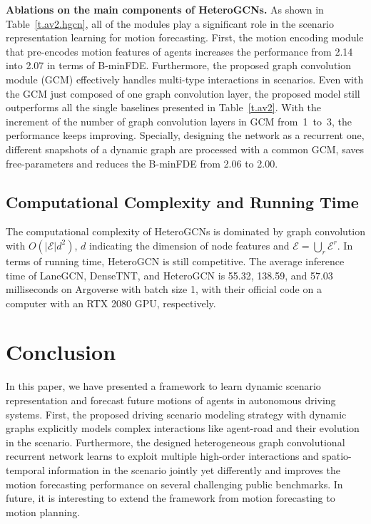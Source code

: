 \documentclass[letterpaper, 10 pt, conference]{ieeeconf}
\begin{document}
\textbf{Ablations on the main components of HeteroGCNs.} As shown in Table~\ref{t.av2.hgcn}, all of the modules play a significant role in the scenario representation learning for motion forecasting. First, the motion encoding module that pre-encodes motion features of agents
increases the performance from 2.14 into 2.07 in terms of B-minFDE. Furthermore, the proposed graph convolution module (GCM) effectively handles multi-type interactions in  scenarios. Even with the GCM just composed of one graph convolution layer, the proposed model still outperforms all the single baselines presented in Table~\ref{t.av2}. With the increment of the number of graph convolution layers in GCM from~1~to~3, the performance keeps improving. Specially, designing the network as a recurrent one,  different snapshots of a dynamic graph are processed with a common GCM,  saves free-parameters and reduces the B-minFDE from 2.06 to 2.00. 


\subsection{Computational Complexity and Running Time}
The computational complexity of HeteroGCNs is dominated by graph convolution with $O(|\mathcal{E}|d^2)$, $d$ indicating the dimension of node features and $\mathcal{E}=\bigcup_{r} \mathcal{E}^r$. In terms of running time, HeteroGCN is still competitive. The average inference time of LaneGCN, DenseTNT, and  HeteroGCN  is 55.32, 138.59, and 57.03 milliseconds on Argoverse with batch size 1,  with their official code on a computer with an RTX 2080 GPU, respectively.
           
\section{Conclusion}
\label{sec:conclusion}
In this paper, we have presented a framework to learn dynamic scenario representation and forecast future motions of agents in autonomous driving systems. First, the proposed driving scenario modeling strategy with dynamic graphs explicitly models complex interactions like agent-road and their evolution in the scenario. Furthermore, 
the designed heterogeneous graph convolutional recurrent network
learns to exploit multiple high-order interactions and spatio-temporal information in the scenario jointly yet differently and improves the motion forecasting performance on several challenging public benchmarks.  In future, it is interesting to extend the framework from motion forecasting to motion planning.



\end{document}
